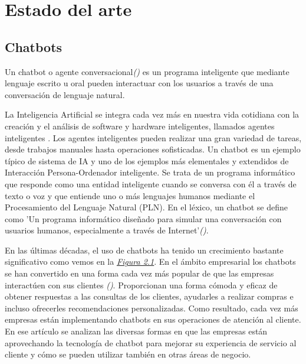 \chapter{Estado del arte}

\section{Chatbots}

Un chatbot o agente conversacional\textit{(\cite{chatbots2020})} es un programa inteligente que mediante lenguaje escrito u oral pueden interactuar con los usuarios a través de una conversación de lenguaje natural. 

La Inteligencia Artificial se integra cada vez más en nuestra vida cotidiana con la creación y el análisis de software y hardware inteligentes, llamados agentes inteligentes . Los agentes inteligentes pueden realizar una gran variedad de tareas, desde trabajos manuales hasta operaciones sofisticadas. Un chatbot es un ejemplo típico de sistema de IA y uno de los ejemplos más elementales y extendidos de Interacción Persona-Ordenador inteligente. Se trata de un programa informático que responde como una entidad inteligente cuando se conversa con él a través de texto o voz y que entiende uno o más lenguajes humanos mediante el Procesamiento del Lenguaje Natural (PLN). En el léxico, un chatbot se define como 'Un programa informático diseñado para simular una conversación con usuarios humanos, especialmente a través de Internet'\textit{(\cite{chatbotdef})}.

En las últimas décadas, el uso de chatbots ha tenido un crecimiento bastante significativo como vemos en la  \textit{\hyperref[fig:crecimiento]{Figura 2.1}}. En el ámbito empresarial los chatbots se han convertido en una forma cada vez más popular de que las empresas interactúen con sus clientes \textit{(\cite{techinnovation})}. Proporcionan una forma cómoda y eficaz de obtener respuestas a las consultas de los clientes, ayudarles a realizar compras e incluso ofrecerles recomendaciones personalizadas. Como resultado, cada vez más empresas están implementando chatbots en sus operaciones de atención al cliente. En ese artículo se analizan las diversas formas en que las empresas están aprovechando la tecnología de chatbot para mejorar su experiencia de servicio al cliente y cómo se pueden utilizar también en otras áreas de negocio.

